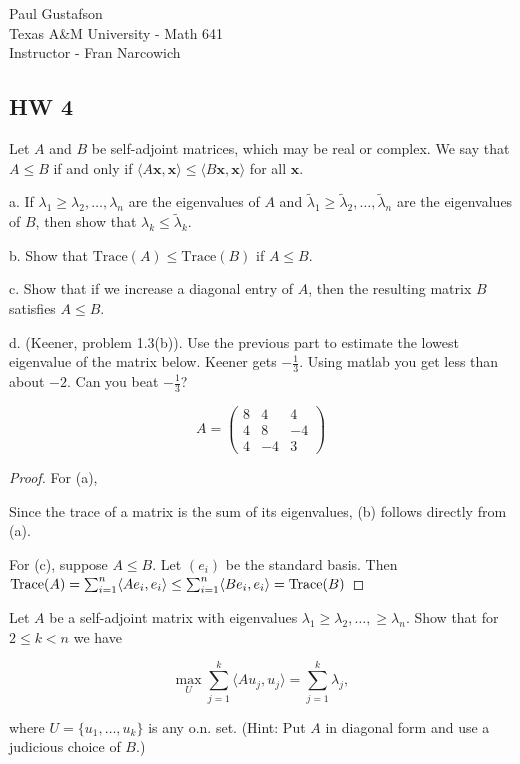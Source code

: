 \documentclass{article}
\begin{document}
\noindent Paul Gustafson\\
\noindent Texas A\&M University - Math 641\\ 
\noindent Instructor - Fran Narcowich

\subsection*{HW 4}
  Let $A$ and $B$ be self-adjoint matrices, which may be real or
  complex. We say that $A\le B$ if and only if $\langle A\mathbf
  x,\mathbf x\rangle \le \langle B\mathbf x,\mathbf x\rangle$ for all
  $\mathbf x$. 

a. If $\lambda_1\ge \lambda_2,\ldots,\lambda_n$ are the eigenvalues
  of $A$ and $\tilde \lambda_1\ge \tilde \lambda_2,\ldots,\tilde
  \lambda_n$ are the eigenvalues of $B$, then show that $\lambda_k \le
  \tilde \lambda_k$.

b. Show that $\text{Trace}(A) \le \text{Trace}(B)$ if $A\le B$.

c. Show that if we increase a diagonal entry of $A$, then the
  resulting matrix $B$ satisfies $A\le B$.

d. (Keener, problem 1.3(b)). Use the previous part to estimate the
lowest eigenvalue of the matrix below. Keener gets $-\frac13$. Using
matlab you get less than about $-2$. Can you beat $-\frac13$?

\[ 
A=\begin{pmatrix}8 & 4 & 4\\ 4 & 8 & -4 \\ 4 &
-4 & 3\end{pmatrix} 
\]

\begin{proof}
For (a), 

Since the trace of a matrix is the sum of its eigenvalues, (b) follows directly from (a).

For (c), suppose $A \le B$. Let $(e_i)$ be the standard basis.  
Then $\operatorname{Trace}(A) = \sum_{i=1}^n \langle A e_i, e_i \rangle \le \sum_{i=1}^n \langle B e_i, e_i \rangle = \operatorname{Trace}(B)$

\end{proof}



 Let $A$ be a self-adjoint matrix with eigenvalues $\lambda_1\ge
\lambda_2,\ldots,\ge \lambda_n$. Show that for $ 2\le k < n$ we have 

\[ \max_U \sum_{j=1}^k \langle Au_j,u_j \rangle =\sum_{j=1}^k
\lambda_j, \]

where $U=\{u_1,\ldots,u_k\}$ is any o.n. set.  (Hint: Put $A$ in
diagonal form and use a judicious choice of $B$.)
\end{document}
